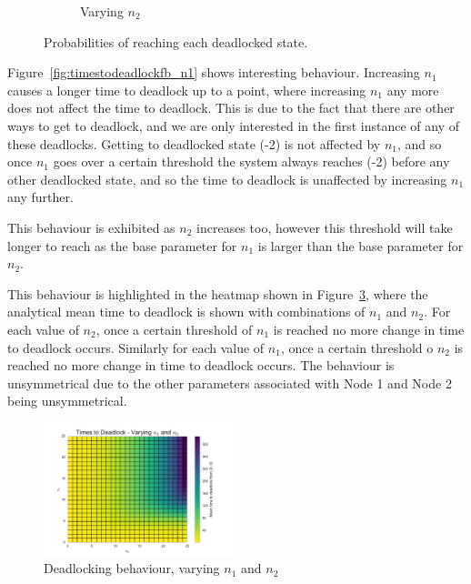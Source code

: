 \documentclass{article}
\begin{document}
\begin{figure}[!htbp]
\begin{subfigure}[b]{0.5\textwidth}
  \caption{Varying $n_2$}
  \label{fig:absprobn2}
\end{subfigure}
\caption{Probabilities of reaching each deadlocked state.}
\label{fig:absorbingprobs}
\end{figure}

Figure~\ref{fig:timestodeadlockfb_n1} shows interesting behaviour.
Increasing $n_1$ causes a longer time to deadlock up to a point, where increasing $n_1$ any more does not affect the time to deadlock.
This is due to the fact that there are other ways to get to deadlock, and we are only interested in the first instance of any of these deadlocks.
Getting to deadlocked state (-2) is not affected by $n_1$, and so once $n_1$ goes over a certain threshold the system always reaches (-2) before any other deadlocked state, and so the time to deadlock is unaffected by increasing $n_1$ any further.

This behaviour is exhibited as $n_2$ increases too, however this threshold will take longer to reach as the base parameter for $n_1$ is larger than the base parameter for $n_2$.

This behaviour is highlighted in the heatmap shown in Figure~\ref{fig:capacitiesheatmap}, where the analytical mean time to deadlock is shown with combinations of $n_1$ and $n_2$.
For each value of $n_2$, once a certain threshold of $n_1$ is reached no more change in time to deadlock occurs.
Similarly for each value of $n_1$, once a certain threshold o $n_2$ is reached no more change in time to deadlock occurs.
The behaviour is unsymmetrical due to the other parameters associated with Node 1 and Node 2 being unsymmetrical.

\begin{figure}[!htbp]
  \begin{center}
  \includegraphics[width=0.5\textwidth]{images/n1n2_heatmap}
  \caption{Deadlocking behaviour, varying $n_1$ and $n_2$}
  \label{fig:capacitiesheatmap}
  \end{center}
\end{figure}
\end{document}
